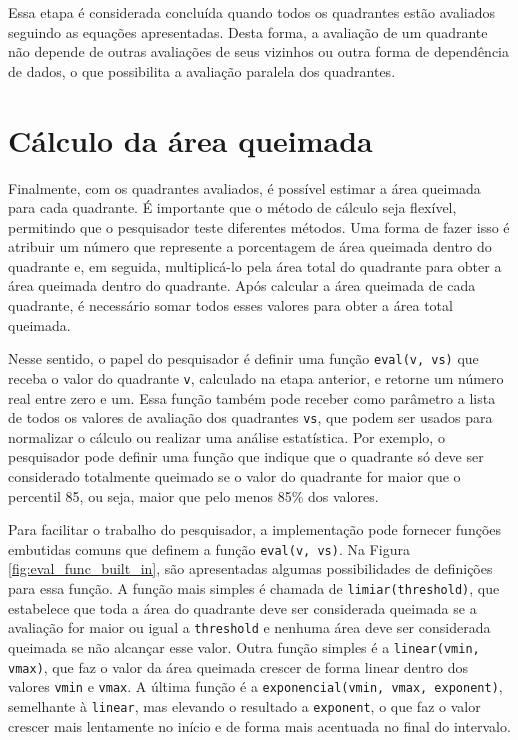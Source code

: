 \documentclass[cic,tc]{iiufrgs}
\begin{document}
Essa etapa é considerada concluída quando todos os quadrantes estão avaliados seguindo as equações apresentadas. Desta forma, a avaliação de um quadrante não depende de outras avaliações de seus vizinhos ou outra forma de dependência de dados, o que possibilita a avaliação paralela dos quadrantes.

\section{Cálculo da área queimada}
\label{sec:calculo_area_queimada}

Finalmente, com os quadrantes avaliados, é possível estimar a área queimada para cada quadrante. É importante que o método de cálculo seja flexível, permitindo que o pesquisador teste diferentes métodos. Uma forma de fazer isso é atribuir um número que represente a porcentagem de área queimada dentro do quadrante e, em seguida, multiplicá-lo pela área total do quadrante para obter a área queimada dentro do quadrante. Após calcular a área queimada de cada quadrante, é necessário somar todos esses valores para obter a área total queimada.

Nesse sentido, o papel do pesquisador é definir uma função \texttt{eval(v, vs)} que receba o valor do quadrante \texttt{v}, calculado na etapa anterior, e retorne um número real entre zero e um. Essa função também pode receber como parâmetro a lista de todos os valores de avaliação dos quadrantes \texttt{vs}, que podem ser usados para normalizar o cálculo ou realizar uma análise estatística. Por exemplo, o pesquisador pode definir uma função que indique que o quadrante só deve ser considerado totalmente queimado se o valor do quadrante for maior que o percentil 85, ou seja, maior que pelo menos 85\% dos valores.

Para facilitar o trabalho do pesquisador, a implementação pode fornecer funções embutidas comuns que definem a função \texttt{eval(v, vs)}. Na Figura \ref{fig:eval_func_built_in}, são apresentadas algumas possibilidades de definições para essa função. A função mais simples é chamada de \texttt{limiar(threshold)}, que estabelece que toda a área do quadrante deve ser considerada queimada se a avaliação for maior ou igual a \texttt{threshold} e nenhuma área deve ser considerada queimada se não alcançar esse valor. Outra função simples é a \texttt{linear(vmin, vmax)}, que faz o valor da área queimada crescer de forma linear dentro dos valores \texttt{vmin} e \texttt{vmax}. A última função é a \texttt{exponencial(vmin, vmax, exponent)}, semelhante à \texttt{linear}, mas elevando o resultado a \texttt{exponent}, o que faz o valor crescer mais lentamente no início e de forma mais acentuada no final do intervalo.
\end{document}
